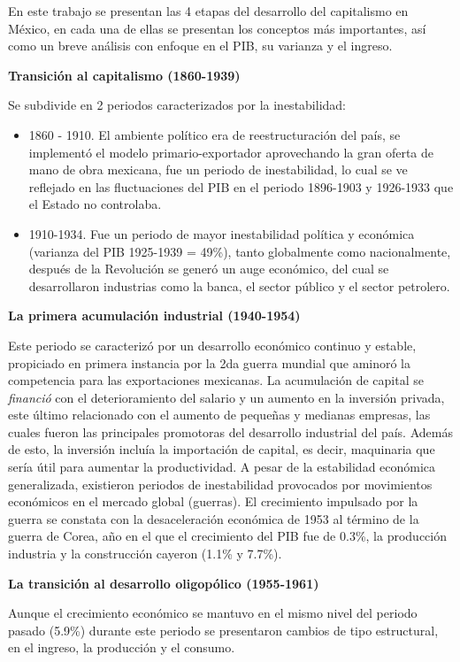 En este trabajo se presentan las 4 etapas del desarrollo del capitalismo en México, en cada una de ellas se presentan los conceptos más importantes, así como un breve análisis con enfoque en el PIB, su varianza y el ingreso.

\textbf{Transición al capitalismo (1860-1939)}

Se subdivide en 2 periodos caracterizados por la inestabilidad:
\begin{itemize}
    \item 1860 - 1910. El ambiente político era de reestructuración del país, se implementó el modelo primario-exportador aprovechando la gran oferta de mano de obra mexicana, fue un periodo de inestabilidad, lo cual se ve reflejado en las fluctuaciones del PIB en el periodo 1896-1903 y 1926-1933 que el Estado no controlaba.
    \item 1910-1934. Fue un periodo de mayor inestabilidad política y económica (varianza del PIB 1925-1939 = 49\%), tanto globalmente como nacionalmente, después de la Revolución se generó un auge económico, del cual se desarrollaron industrias como la banca, el sector público y el sector petrolero.
\end{itemize}

\textbf{La primera acumulación industrial (1940-1954)}

Este periodo se caracterizó por un desarrollo económico continuo y estable, propiciado en primera instancia por la 2da guerra mundial que aminoró la competencia para las exportaciones mexicanas.
La acumulación de capital se \textit{financió} con el deterioramiento del salario y un aumento en la inversión privada, este último relacionado con el aumento de pequeñas y medianas empresas, las cuales fueron las principales promotoras del desarrollo industrial del país. Además de esto, la inversión incluía la importación de capital, es decir, maquinaria que sería útil para aumentar la productividad.
A pesar de la estabilidad económica generalizada, existieron periodos de inestabilidad provocados por movimientos económicos en el mercado global (guerras).
El crecimiento impulsado por la guerra se constata con la desaceleración económica de 1953 al término de la guerra de Corea, año en el que el crecimiento del PIB fue de 0.3\%, la producción industria y la construcción cayeron (1.1\% y 7.7\%).

\textbf{La transición al desarrollo oligopólico (1955-1961)}

Aunque el crecimiento económico se mantuvo en el mismo nivel del periodo pasado (5.9\%) durante este periodo se presentaron cambios de tipo estructural, en el ingreso, la producción y el consumo.

